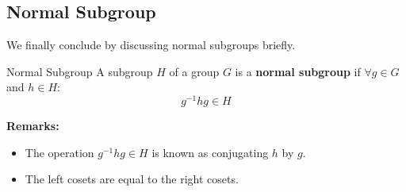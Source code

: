 \documentclass[letterpaper]{article}
\begin{document}
\subsection{Normal Subgroup}
We finally conclude by discussing normal subgroups briefly. 
\begin{definition}{Normal Subgroup}{}
    A subgroup $H$ of a group $G$ is a \textbf{normal subgroup} if $\forall g \in G$ and $h \in H$: 
    \[g^{-1} h g \in H\]
\end{definition}
\textbf{Remarks:}
\begin{itemize}
    \item The operation $g^{-1} h g \in H$ is known as conjugating $h$ by $g$. 
    \item The left cosets are equal to the right cosets. 
\end{itemize}
\end{document}

